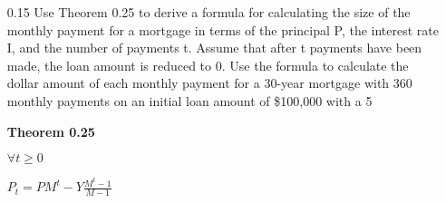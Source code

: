 \begin{enumerate}
\item[0.15]
Use Theorem 0.25 to derive a formula for calculating the size of the monthly payment for a mortgage in terms of the principal P, the interest rate I, and the number of payments t. Assume that after t payments have been made, the loan amount is reduced to 0. Use the formula to calculate the dollar amount of each monthly payment for a 30-year mortgage with 360 monthly payments on an initial loan amount of \$100,000 with a 5%


\textbf{Theorem 0.25}

$\forall t \geq 0$


$P_t=PM^t-Y\frac{M^t-1}{M-1}$
\end{enumerate}